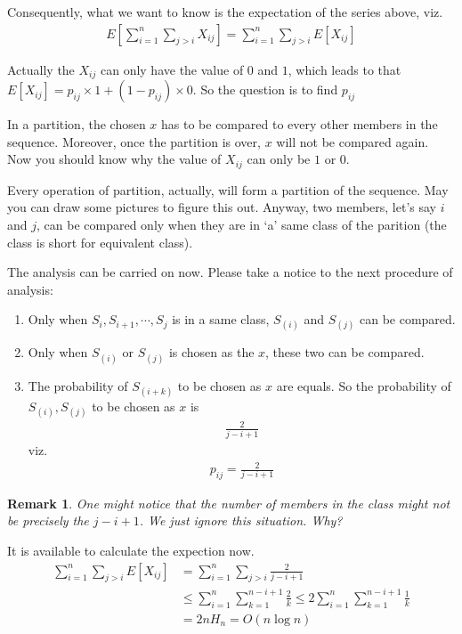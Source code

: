\documentclass[a4paper, 10pt]{ctexart} %
\newtheorem{remark}{Remark}
\begin{document}
Consequently, what we want to know is the expectation of the series above,
viz. 
\begin{align*}
    E \left[ \sum_{i=1} ^{n} \sum_{j > i}  X_{ij} \right] = \sum_{i=1}^{n} \sum_{ j > i}  E\left[ X_{ij} \right]
\end{align*}

Actually the 
$X_{ij}$ can only have the value of 
$0 $ and $ 1$, which leads to that 
$E \left[ X_{ij} \right] =  p_{ij} \times 1 + \left(1-  p_{ij} \right) \times 0$.
So the question is to find $p_{ij}$

In a partition, the chosen $x$ has to be compared to every 
other members in the sequence.
Moreover, once the partition is over, 
$x $ will not be compared again. Now you should know why the value of $X_{ij}$ can only be $1 $ or $0$.

Every operation of partition, actually, will form a partition of 
the sequence. May you can draw some pictures to figure this out.
Anyway, two members, let's say $i$ and $j$, can be compared only when they are 
in `a' same class of the parition (the class is short for equivalent class). 

The analysis can be carried on now. Please take a notice to the next procedure of analysis: 
\begin{enumerate}
    \item Only when $S_{i} , S_{i + 1} , \cdots  , S_{j}$ is in a same class, $S_{(i)}$ and $S_{\left(j\right)}$ can be compared.
    \item Only when $S_{\left(i\right)} $ or $S_{\left(j\right)}$ is chosen as the $x$, these two can be compared.
    \item The probability of $S_{\left(i +k\right)}$ to be chosen as $x$ are equals. So the probability of $S_{\left(i\right)} , S_{\left(j\right)}$ to be chosen as $x$ is 
    \begin{align*}
        \frac{2}{ j   - i + 1}
    \end{align*}
    viz. 
    \begin{align*}
        p_{ij} =  \frac{2}{ j  -i + 1}
    \end{align*}
\end{enumerate}
\begin{remark}
    One might notice that the number of members in the class might not be precisely the $j - i + 1$.
    We just ignore this situation. Why?
\end{remark}

It is available to calculate the expection now. 
\begin{align*}
    \sum_{i=1} ^{n} \sum_{ j >  i }  E \left[ X_{ij} \right] & 
    = \sum_{i=1} ^{n}\sum_{j > i}  \frac{2}{j - i  +1} \\
    & \le \sum_{ i = 1}  ^{n} \sum_{k=1} ^{n  - i + 1} \frac{2}{k} \le 2 \sum_{i=1} ^{n} \sum_{ k =1} ^{n - i  + 1} \frac{1}{k} \\
    & = 2n H_{n} = O\left( n \log n\right)
\end{align*}
\end{document}
